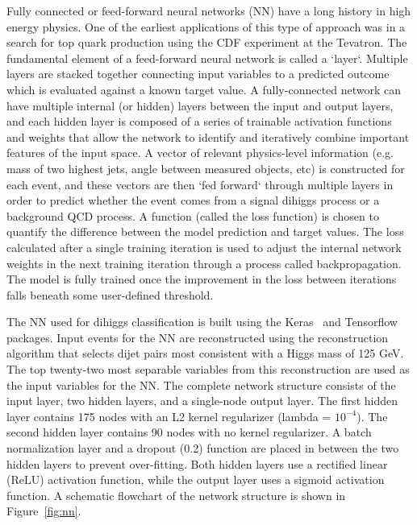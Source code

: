 \label{sec:NN}
Fully connected or feed-forward neural networks (NN) have a long history in high energy physics. One of the earliest applications of this type of approach was in a search for top quark production using the CDF experiment at the Tevatron. The fundamental element of a feed-forward neural network is called a `layer`. Multiple layers are stacked together connecting input variables to a predicted outcome which is evaluated against a known target value. A fully-connected network can have multiple internal (or hidden) layers between the input and output layers, and each hidden layer is composed of a series of trainable activation functions and weights that allow the network to identify and iteratively combine important features of the input space. A vector of relevant physics-level information (e.g. mass of two highest \pt jets, angle between measured objects, etc) is constructed for each event, and these vectors are then `fed forward` through multiple layers in order to predict whether the event comes from a signal dihiggs process or a background QCD process. A function (called the loss function) is chosen to quantify the difference between the model prediction and target values. The loss calculated after a single training iteration is used to adjust the internal network weights in the next training iteration through a process called backpropagation. The model is fully trained once the improvement in the loss between iterations falls beneath some user-defined threshold.

The NN used for dihiggs classification is built using the Keras~\cite{chollet2015keras} and Tensorflow~\cite{tensorflow} packages. Input events for the NN are reconstructed using the reconstruction algorithm that selects dijet pairs most consistent with a Higgs mass of 125 GeV. The top twenty-two most separable variables from this reconstruction are used as the input variables for the NN. The complete network structure consists of the input layer, two hidden layers, and a single-node output layer. The first hidden layer contains 175 nodes with an L2 kernel regularizer (lambda = $10^{-4}$). The second hidden layer contains 90 nodes with no kernel regularizer. A batch normalization layer and a dropout (0.2) function are placed in between the two hidden layers to prevent over-fitting. Both hidden layers use a rectified linear (ReLU) activation function, while the output layer uses a sigmoid activation function. A schematic flowchart of the network structure is shown in Figure~\ref{fig:nn}.

